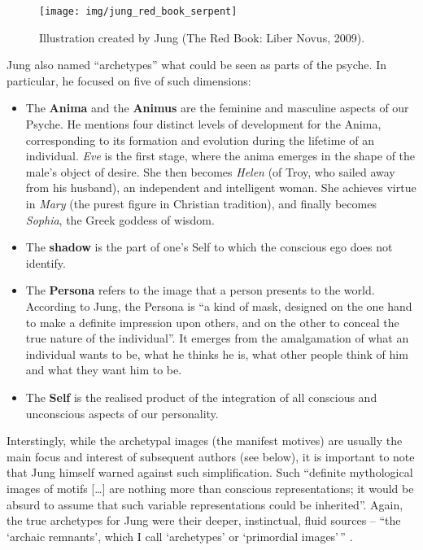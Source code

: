 \documentclass[
]{book}
\providecommand{\tightlist}{%
  \setlength{\itemsep}{0pt}\setlength{\parskip}{0pt}}
\begin{document}
\begin{figure}

{\centering \texttt{[image: img/jung\_red\_book\_serpent]} 

}

\caption{Illustration created by Jung (The Red Book: Liber Novus, 2009).}\label{fig:unnamed-chunk-7}
\end{figure}

Jung also named ``archetypes'' what could be seen as parts of the psyche. In particular, he focused on five of such dimensions:

\begin{itemize}
\tightlist
\item
  The \textbf{Anima} and the \textbf{Animus} are the feminine and masculine aspects of our Psyche. He mentions four distinct levels of development for the Anima, corresponding to its formation and evolution during the lifetime of an individual. \emph{Eve} is the first stage, where the anima emerges in the shape of the male's object of desire. She then becomes \emph{Helen} (of Troy, who sailed away from his husband), an independent and intelligent woman. She achieves virtue in \emph{Mary} (the purest figure in Christian tradition), and finally becomes \emph{Sophia}, the Greek goddess of wisdom.
\item
  The \textbf{shadow} is the part of one's Self to which the conscious ego does not identify.
\item
  The \textbf{Persona} refers to the image that a person presents to the world. According to Jung, the Persona is ``a kind of mask, designed on the one hand to make a definite impression upon others, and on the other to conceal the true nature of the individual''. It emerges from the amalgamation of what an individual wants to be, what he thinks he is, what other people think of him and what they want him to be.
\item
  The \textbf{Self} is the realised product of the integration of all conscious and unconscious aspects of our personality.
\end{itemize}

Interstingly, while the archetypal images (the manifest motives) are usually the main focus and interest of subsequent authors (see below), it is important to note that Jung himself warned against such simplification. Such ``definite mythological images of motifs {[}\ldots{]} are nothing more than conscious representations; it would be absurd to assume that such variable representations could be inherited''. Again, the true archetypes for Jung were their deeper, instinctual, fluid sources -- ``the `archaic remnants', which I call `archetypes' or `primordial images'\,'' \citep{jung1964approaching}.
\end{document}
